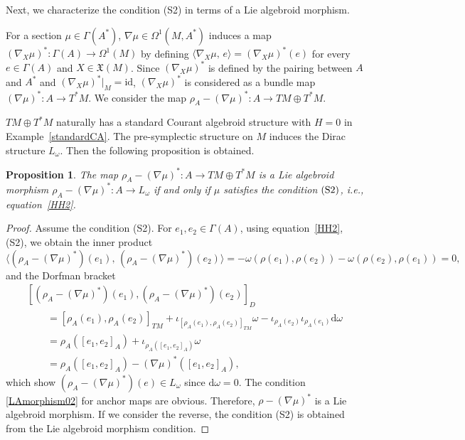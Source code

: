 \documentclass[pdftex]{sigma}
\numberwithin{equation}{section}
\newtheorem{Proposition}[Theorem]{Proposition}
 { \theoremstyle{definition}
\newtheorem{Definition}[Theorem]{Definition}
\newtheorem{Note}[Theorem]{Note}
\newtheorem{Example}[Theorem]{Example}
\newtheorem{Remark}[Theorem]{Remark}
\newtheorem{Question}[Theorem]{Question}
 }
\newcommand{\courant}[2]{{[{{#1},{#2}}]_D}}
\newcommand{\rhoa}{{\rho_A}}
\newcommand{\bracket}[2]{\langle #1,\,#2\rangle}
\newcommand{\rd}{\mathrm{d}}
\begin{document}
Next, we characterize the condition (S2) in terms of a Lie algebroid morphism.

For a section $\mu \in \Gamma(A^*)$, $\nabla \mu \in \Omega^1(M, A^*)$
induces a map $(\nabla_X \mu)^*\colon \Gamma(A) \rightarrow \Omega^1(M)$
by defining $\bracket{\nabla_X \mu}{e} = (\nabla_X \mu)^*(e)$
for every $e \in \Gamma(A)$ and $X \in \mathfrak{X}(M)$.
Since $(\nabla_X \mu)^*$ is defined by the pairing between $A$ and $A^*$
and $(\nabla_X \mu)^*|_M = \mathrm{id}$,
$(\nabla_X \mu)^*$ is considered as a bundle map~${(\nabla \mu)^*\colon A \rightarrow T^*M}$.
We consider the map
$\rhoa - (\nabla \mu)^*\colon A \rightarrow TM \oplus T^*M$.

$TM \oplus T^*M$ naturally has a standard Courant algebroid structure
with $H=0$ in Example~\ref{standardCA}.
The pre-symplectic structure on $M$ induces the Dirac structure $L_{\omega}$.
Then the following proposition is obtained.
\begin{Proposition}\label{SympS2}
The map $\rhoa - (\nabla \mu)^*\colon A \rightarrow TM \oplus T^*M$
is a Lie algebroid morphism ${\rhoa - (\nabla \mu)^*\colon A \rightarrow L_{\omega}}$
if and only if $\mu$
satisfies the condition $\rm (S2)$, i.e., equation~\eqref{HH2}.
\end{Proposition}

\begin{proof}
Assume the condition (S2). For $e_1, e_2 \in \Gamma(A)$,
using equation~\eqref{HH2}, (S2), we obtain the inner product
\[
\bracket{(\rhoa - (\nabla \mu)^*)(e_1)}{(\rhoa - (\nabla \mu)^*)(e_2)}
= - \omega(\rho(e_1), \rho(e_2)) - \omega(\rho(e_2), \rho(e_1)) =0,
\]
and the Dorfman bracket
\begin{gather*}
 \courant{(\rhoa - (\nabla \mu)^*)(e_1)}{(\rhoa - (\nabla \mu)^*)(e_2)}\\
\qquad= [\rhoa(e_1), \rhoa(e_2)]_{TM}
+ \iota_{[\rhoa(e_1), \rhoa(e_2)]_{TM}}\omega
- \iota_{\rhoa(e_2)} \iota_{\rhoa(e_1)} \rd \omega
 \\
\qquad= \rhoa([e_1, e_2]_A)
+ \iota_{\rhoa([e_1, e_2]_A)}\omega
 \\
\qquad= \rhoa([e_1, e_2]_A) - (\nabla \mu)^*([e_1, e_2]_A),
\end{gather*}
which show $(\rhoa - (\nabla \mu)^*)(e) \in L_{\omega}$
since $\rd \omega =0$.
The condition \eqref{LAmorphism02} for anchor maps are obvious.
Therefore, $\rho - (\nabla \mu)^*$ is a Lie algebroid morphism.
If we consider the reverse, the condition (S2) is obtained from the Lie algebroid morphism condition.
\end{proof}
\end{document}
